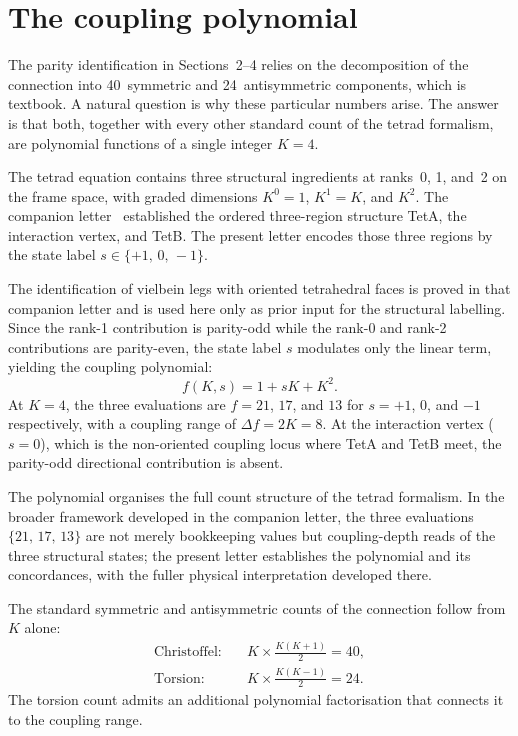 \documentclass[twocolumn]{iopjournal}
\begin{document}

\section{The coupling polynomial}

The parity identification in Sections~2--4 relies on the
decomposition of the connection into 40~symmetric and
24~antisymmetric components, which is textbook. A natural
question is why these particular numbers arise. The answer is
that both, together with every other standard count of the
tetrad formalism, are polynomial functions of a single integer
$K = 4$.

The tetrad equation contains three structural ingredients at
ranks~0, 1, and~2 on the frame space, with graded dimensions
$K^0 = 1$, $K^1 = K$, and $K^2$. The companion
letter~\cite{Nelson2026a} established the ordered three-region
structure TetA, the interaction vertex, and TetB. The present
letter encodes those three regions by the state label
$s \in \{+1,\,0,\,-1\}$.

The identification of vielbein legs with oriented tetrahedral
faces is proved in that companion letter and is used here only
as prior input for the structural labelling. Since the rank-1
contribution is parity-odd while the rank-0 and rank-2
contributions are parity-even, the state label $s$ modulates
only the linear term, yielding the coupling polynomial:
\begin{equation}
  f(K, s) = 1 + sK + K^2.
  \label{eq:poly}
\end{equation}
At $K = 4$, the three evaluations are $f = 21$, $17$, and $13$
for $s = +1$, $0$, and $-1$ respectively, with a coupling range
of $\Delta f = 2K = 8$. At the interaction vertex ($s = 0$),
which is the non-oriented coupling locus where TetA and TetB
meet, the parity-odd directional contribution is absent.

The polynomial organises the full count structure of the tetrad
formalism. In the broader framework developed in the companion
letter, the three evaluations $\{21,\,17,\,13\}$ are not merely
bookkeeping values but coupling-depth reads of the three
structural states; the present letter establishes the polynomial
and its concordances, with the fuller physical interpretation
developed there.

The standard symmetric and antisymmetric counts of the
connection follow from $K$ alone:
\begin{align}
  \text{Christoffel:}\quad
    & K \times \frac{K(K{+}1)}{2} = 40,
    \label{eq:chris} \\[4pt]
  \text{Torsion:}\quad
    & K \times \frac{K(K{-}1)}{2} = 24.
    \label{eq:tors}
\end{align}
The torsion count admits an additional polynomial factorisation
that connects it to the coupling range.
\end{document}
